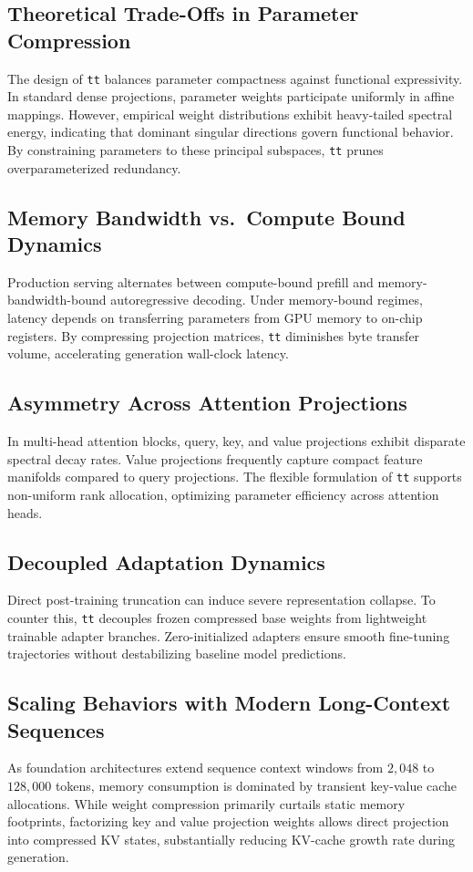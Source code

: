 \subsection{Theoretical Trade-Offs in Parameter Compression}
The design of \texttt{tt} balances parameter compactness against functional expressivity. In standard dense projections, parameter weights participate uniformly in affine mappings. However, empirical weight distributions exhibit heavy-tailed spectral energy, indicating that dominant singular directions govern functional behavior. By constraining parameters to these principal subspaces, \texttt{tt} prunes overparameterized redundancy.

\subsection{Memory Bandwidth vs.\ Compute Bound Dynamics}
Production serving alternates between compute-bound prefill and memory-bandwidth-bound autoregressive decoding. Under memory-bound regimes, latency depends on transferring parameters from GPU memory to on-chip registers. By compressing projection matrices, \texttt{tt} diminishes byte transfer volume, accelerating generation wall-clock latency.

\subsection{Asymmetry Across Attention Projections}
In multi-head attention blocks, query, key, and value projections exhibit disparate spectral decay rates. Value projections frequently capture compact feature manifolds compared to query projections. The flexible formulation of \texttt{tt} supports non-uniform rank allocation, optimizing parameter efficiency across attention heads.

\subsection{Decoupled Adaptation Dynamics}
Direct post-training truncation can induce severe representation collapse. To counter this, \texttt{tt} decouples frozen compressed base weights from lightweight trainable adapter branches. Zero-initialized adapters ensure smooth fine-tuning trajectories without destabilizing baseline model predictions.

\subsection{Scaling Behaviors with Modern Long-Context Sequences}
As foundation architectures extend sequence context windows from $2{,}048$ to $128{,}000$ tokens, memory consumption is dominated by transient key-value cache allocations. While weight compression primarily curtails static memory footprints, factorizing key and value projection weights allows direct projection into compressed KV states, substantially reducing KV-cache growth rate during generation.

